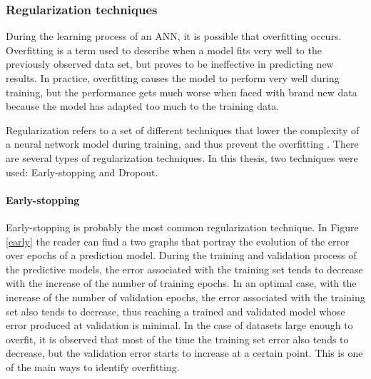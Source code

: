 \subsubsection{Regularization techniques}\label{chap3:subsubsec:regularization_techniques}

During the learning process of an \ac{ANN}, it is possible that overfitting occurs. Overfitting is a term used to describe when a model fits very well to the previously observed data set, but proves to be ineffective in predicting new results. In practice, overfitting causes the model to perform very well during training, but the performance gets much worse when faced with brand new data because the model has adapted too much to the training data.  

Regularization refers to a set of different techniques that lower the complexity of a neural network model during training, and thus prevent the overfitting \cite{reg0}. There are several types of regularization techniques. In this thesis, two techniques were used: Early-stopping and Dropout.

\paragraph{Early-stopping}\label{sec:early}

Early-stopping is probably the most common regularization technique. In Figure \ref{early} the reader can find a two graphs that portray the evolution of the error over epochs of a prediction model. During the training and validation process of the predictive models, the error associated with the training set tends to decrease with the increase of the number of training epochs. In an optimal case, with the increase of the number of validation epochs, the error associated with the training set also tends to decrease, thus reaching a trained and validated model whose error produced at validation is minimal. In the case of datasets large enough to overfit, it is observed that most of the time the training set error also tends to decrease, but the validation error starts to increase at a certain point. This is one of the main ways to identify overfitting.

